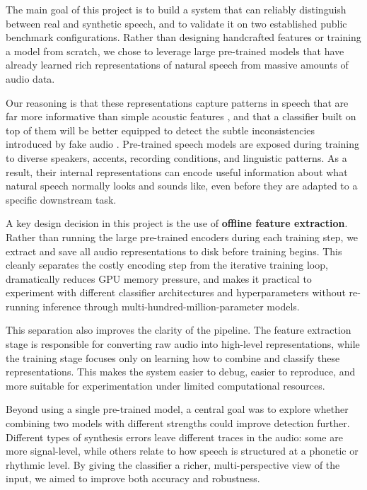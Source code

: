 \documentclass[11pt,a4paper]{article}
\begin{document}
The main goal of this project is to build a system that can reliably distinguish
between real and synthetic speech, and to validate it on two established public
benchmark configurations. Rather than designing handcrafted features or training a
model from scratch, we chose to leverage large pre-trained models
\cite{chen2022wavlm,radford2023whisper} that have already learned rich
representations of natural speech from massive amounts of audio data.

Our reasoning is that these representations capture patterns in speech that are
far more informative than simple acoustic features
\cite{yang2021superb,elkheir2025comprehensive}, and that a classifier built on
top of them will be better equipped to detect the subtle inconsistencies introduced
by fake audio \cite{guo2024wavlm,combei2024wavlm,stourbe2024wavlm}. Pre-trained
speech models are exposed during training to diverse speakers, accents, recording
conditions, and linguistic patterns. As a result, their internal representations
can encode useful information about what natural speech normally looks and sounds
like, even before they are adapted to a specific downstream task.

A key design decision in this project is the use of \textbf{offline feature
extraction}. Rather than running the large pre-trained encoders during each
training step, we extract and save all audio representations to disk before
training begins. This cleanly separates the costly encoding step from the iterative
training loop, dramatically reduces GPU memory pressure, and makes it practical to
experiment with different classifier architectures and hyperparameters without
re-running inference through multi-hundred-million-parameter models.

This separation also improves the clarity of the pipeline. The feature extraction
stage is responsible for converting raw audio into high-level representations,
while the training stage focuses only on learning how to combine and classify these
representations. This makes the system easier to debug, easier to reproduce, and
more suitable for experimentation under limited computational resources.

Beyond using a single pre-trained model, a central goal was to explore whether
combining two models with different strengths could improve detection further.
Different types of synthesis errors leave different traces in the audio: some are
more signal-level, while others relate to how speech is structured at a phonetic
or rhythmic level. By giving the classifier a richer, multi-perspective view of
the input, we aimed to improve both accuracy and robustness.
\end{document}
